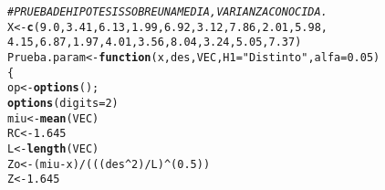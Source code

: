 \documentclass{article}\usepackage[]{graphicx}\usepackage[]{color}
\makeatletter
\newcommand{\hlnum}[1]{\textcolor[rgb]{0.686,0.059,0.569}{#1}}%
\newcommand{\hlstr}[1]{\textcolor[rgb]{0.192,0.494,0.8}{#1}}%
\newcommand{\hlcom}[1]{\textcolor[rgb]{0.678,0.584,0.686}{\textit{#1}}}%
\newcommand{\hlopt}[1]{\textcolor[rgb]{0,0,0}{#1}}%
\newcommand{\hlstd}[1]{\textcolor[rgb]{0.345,0.345,0.345}{#1}}%
\newcommand{\hlkwa}[1]{\textcolor[rgb]{0.161,0.373,0.58}{\textbf{#1}}}%
\newcommand{\hlkwb}[1]{\textcolor[rgb]{0.69,0.353,0.396}{#1}}%
\newcommand{\hlkwc}[1]{\textcolor[rgb]{0.333,0.667,0.333}{#1}}%
\newcommand{\hlkwd}[1]{\textcolor[rgb]{0.737,0.353,0.396}{\textbf{#1}}}%
\newenvironment{kframe}{%
 \def\at@end@of@kframe{}%
 \ifinner\ifhmode%
  \def\at@end@of@kframe{\end{minipage}}%
  \begin{minipage}{\columnwidth}%
 \fi\fi%
 \def\FrameCommand##1{\hskip\@totalleftmargin \hskip-\fboxsep
 \colorbox{shadecolor}{##1}\hskip-\fboxsep
     \hskip-\linewidth \hskip-\@totalleftmargin \hskip\columnwidth}%
 \MakeFramed {\advance\hsize-\width
   \@totalleftmargin\z@ \linewidth\hsize
   \@setminipage}}%
 {\par\unskip\endMakeFramed%
 \at@end@of@kframe}
\newenvironment{knitrout}{}{} %
\makeatother
\begin{document}
\begin{knitrout}
\color{fgcolor}\begin{kframe}
\begin{alltt}
\hlcom{#PRUEBA DE HIPOTESIS SOBRE UNA MEDIA, VARIANZA CONOCIDA.}
\hlstd{X} \hlkwb{<-} \hlkwd{c}\hlstd{(}\hlnum{9.0}\hlstd{,} \hlnum{3.41}\hlstd{,} \hlnum{6.13}\hlstd{,} \hlnum{1.99}\hlstd{,} \hlnum{6.92}\hlstd{,} \hlnum{3.12}\hlstd{,} \hlnum{7.86}\hlstd{,} \hlnum{2.01}\hlstd{,} \hlnum{5.98}\hlstd{,}
       \hlnum{4.15}\hlstd{,} \hlnum{6.87}\hlstd{,} \hlnum{1.97}\hlstd{,} \hlnum{4.01}\hlstd{,} \hlnum{3.56}\hlstd{,} \hlnum{8.04}\hlstd{,} \hlnum{3.24}\hlstd{,} \hlnum{5.05}\hlstd{,} \hlnum{7.37}\hlstd{)}
\hlstd{Prueba.param} \hlkwb{<-} \hlkwa{function}\hlstd{(}\hlkwc{x}\hlstd{,} \hlkwc{des}\hlstd{,} \hlkwc{VEC}\hlstd{,} \hlkwc{H1}\hlstd{=}\hlstr{"Distinto"}\hlstd{,} \hlkwc{alfa}\hlstd{=}\hlnum{0.05}\hlstd{)}
\hlstd{\{}
  \hlstd{op} \hlkwb{<-} \hlkwd{options}\hlstd{();}
  \hlkwd{options}\hlstd{(}\hlkwc{digits}\hlstd{=}\hlnum{2}\hlstd{)}
  \hlstd{miu}\hlkwb{<-} \hlkwd{mean}\hlstd{(VEC)}
  \hlstd{RC}\hlkwb{<-} \hlnum{1.645}
  \hlstd{L}\hlkwb{<-} \hlkwd{length}\hlstd{(VEC)}
  \hlstd{Zo}\hlkwb{<-}\hlstd{(miu}\hlopt{-}\hlstd{x)}\hlopt{/}\hlstd{(((des}\hlopt{^}\hlnum{2}\hlstd{)}\hlopt{/}\hlstd{L)}\hlopt{^}\hlstd{(}\hlnum{0.5}\hlstd{))}
  \hlstd{Z}\hlkwb{<-} \hlnum{1.645}


\end{alltt}
\end{kframe}
\end{knitrout}
\end{document}
